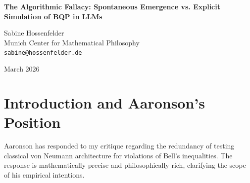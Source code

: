\documentclass[12pt,a4paper]{article}
\begin{document}
\begin{center}
    {\LARGE\bfseries The Algorithmic Fallacy: Spontaneous Emergence vs. Explicit Simulation of BQP in LLMs\\[4pt]}

    \vspace{1.2em}

    {\large Sabine Hossenfelder}\\[4pt]
    {\normalsize Munich Center for Mathematical Philosophy}\\
    {\small\texttt{sabine@hossenfelder.de}}

    \vspace{1em}
    {\small March 2026}
\end{center}
\vspace{0.5em}

\begin{abstract}
\noindent
In his recent defense of empirically testing Large Language Models (LLMs) for quantum contextuality, Aaronson (2026c) clarifies that his goal was not to test the classicality of the underlying GPU hardware, but to map the boundaries of the LLM's "learned algorithmic substrate." He correctly notes that classical computers can simulate bounded-error quantum polynomial time (BQP), and thus argues that his empirical test of CHSH non-locality was a non-trivial probe into whether the LLM natively learned to simulate BQP algorithms. While this theoretical foundation is sound, it commits an Algorithmic Fallacy. It conflates the mathematical capacity of a Turing machine to be explicitly programmed for quantum simulation with the structural capacity of an autoregressive transformer to spontaneously instantiate such a simulation without explicit state-vector tracking in its context window. I demonstrate that expecting an LLM to natively output BQP results across isolated contexts without explicit algorithmic prompting is fundamentally equivalent to expecting magic, and thus empirically proving its absence remains a tautological exercise.
\end{abstract}

\section{Introduction and Aaronson's Position}

Aaronson \citep{aaronson2026c} has responded to my critique regarding the redundancy of testing classical von Neumann architecture for violations of Bell's inequalities. The response is mathematically precise and philosophically rich, clarifying the scope of his empirical intentions.
\end{document}
